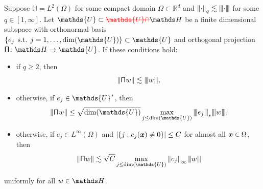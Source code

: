\documentclass[smallextended]{svjour3}
\let\F\mathds\let\C\mathcal\newcommand{\R}{\F{R}}\newcommand{\A}{\tens{A}}
\newcommand{\norm}[1]{{\left\lVert #1 \right\rVert}}
\newcommand{\Norm}[1]{{\left\vert\kern-0.25ex\left\vert\kern-0.25ex\left\vert #1 \right\vert\kern-0.25ex\right\vert\kern-0.25ex\right\vert}}
\newcommand{\op}[1]{\operatorname{#1}}
\newcommand{\1}{\F{1}}
\DeclareMathOperator{\st}{\;s.t.\;}
\newcommand*{\varf}[1]{%
	\IfEqCase{#1}{%
		{0}{u}%
		{1}{v}%
		{2}{w}%
	}[u#1]%
}
\newcommand*{\spcf}[1]{%
	\IfEqCase{#1}{%
		{0}{\F{U}}%
		{1}{\F{V}}%
		{2}{\F{W}}%
	}[\F{U}#1]%
}
\newcommand*{\varx}[1]{%
	\IfEqCase{#1}{%
		{0}{x}%
		{1}{y}%
		{2}{z}%
		{3}{r}%
	}[x#1]%
}
\newcommand{\Domain}{\Omega}\newcommand{\domain}{\omega}
\newcommand*{\vvarx}[1]{\vec{\varx{#1}}}
\newcommand{\edit}[2]{{\ifmmode\text{\color{red}\sout{\ensuremath{#1}}}\else {\color{red} \sout{#1}}\fi} {\color{darkgreen} #2}}
\begin{document}
	\begin{lemma}\label{app:thm: generic a_U bound}
		Suppose $\F H= L^2(\Domain)$ for some compact domain $\Domain\subset\R^d$ and $\norm\cdot_q\lesssim \Norm\cdot$ for some $q\in[1,\infty]$. Let $\spcf0\subset \edit{\spcf0\cap}{}\F H$ be a finite dimensional subspace with orthonormal basis $\{e_j\st j=1,\ldots,\op{dim}(\spcf0)\}\subset\spcf0$ and orthogonal projection $\tens{\Pi}\colon\F H\to\spcf0$. If these conditions hold:
		\begin{itemize}
			\item if $q\geq 2$, then $$\norm{\tens{\Pi}\varf2} \lesssim \Norm{\varf2}, $$
			\item otherwise, if $e_j\in \spcf0^*$, then
			\begin{equation}
				\norm{\tens{\Pi}\varf2} \leq \sqrt{\op{dim}(\spcf0)}\max_{j\leq \op{dim}(\spcf0)}\Norm{e_j}_*\Norm{\varf2},
			\end{equation}
			\item otherwise, if $e_j\in L^\infty(\Domain)$ and $ |\{j:e_j(\vvarx0)\neq 0\}|\leq C$ for almost all $\vvarx0\in\Domain$, then
			\begin{equation}
				\norm{\tens{\Pi}\varf2} \lesssim \sqrt C\max_{j\leq\op{dim}(\spcf0)}\norm{e_j}_{\infty}\Norm{\varf2}
			\end{equation}
		\end{itemize}
		uniformly for all $\varf2\in \F H$.
	\end{lemma}
\end{document}
